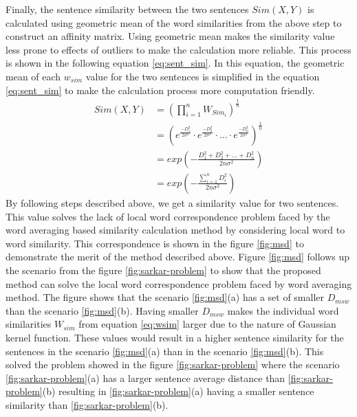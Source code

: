 Finally, the sentence similarity between the two sentences $Sim(X,Y)$ is calculated using geometric mean of the word similarities from the above step to construct an affinity matrix. Using geometric mean makes the similarity value less prone to effects of outliers to make the calculation more reliable. This process is shown in the following equation \ref{eq:sent_sim}. In this equation, the geometric mean of each $w_{sim}$ value for the two sentences is simplified in the equation \ref{eq:sent_sim} to make the calculation process more computation friendly. 
\begin{equation}\label{eq:sent_sim}
    \begin{split}
        Sim(X,Y)
        &=  \left(
                \prod_{i=1}^nW_{Sim_i}
            \right)^{\frac{1}{n}}\\
        &=  \left(
                e^{\frac{-D_1^2}{2\sigma^2}}\cdot
                e^{\frac{-D_2^2}{2\sigma^2}}\cdot
                    \ldots \cdot
                e^{\frac{-D_n^2}{2\sigma^2}}
            \right)^\frac{1}{n}\\
        &=  exp\left(
                -\frac{D_1^2+D_2^2+\ldots+D_n^2}{2n\sigma^2}
            \right)\\
        &=  exp\left(
                -\frac{\sum_{i=1}^nD_i^2}{2n\sigma^2}
            \right)
    \end{split}
\end{equation}
By following steps described above, we get a similarity value for two sentences. This value solves the lack of local word correspondence problem faced by the word averaging based similarity calculation method \cite{roychowdhury-etal-2022-spectral-base} by considering local word to word similarity. This correspondence is shown in the figure \ref{fig:msd} to demonstrate the merit of the method described above. Figure \ref{fig:msd} follows up the scenario from the figure \ref{fig:sarkar-problem} to show that the proposed method can solve the local word correspondence problem faced by word averaging method. The figure shows that the scenario \ref{fig:msd}(a) has a set of smaller $D_{msw}$ than the scenario \ref{fig:msd}(b). Having smaller $D_{msw}$ makes the individual word similarities $W_{sim}$ from equation \ref{eq:wsim} larger due to the nature of Gaussian kernel function. These values would result in a higher sentence similarity for the sentences in the scenario \ref{fig:msd}(a) than in the scenario \ref{fig:msd}(b). This solved the problem showed in the figure \ref{fig:sarkar-problem} where the scenario \ref{fig:sarkar-problem}(a) has a larger sentence average distance than \ref{fig:sarkar-problem}(b) resulting in \ref{fig:sarkar-problem}(a) having a smaller sentence similarity than \ref{fig:sarkar-problem}(b).\\

